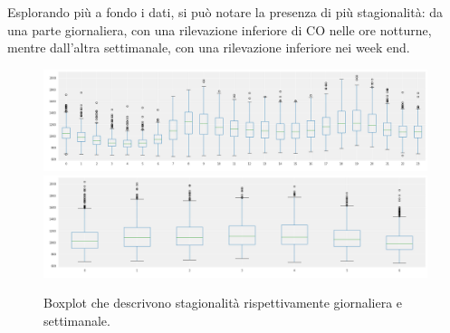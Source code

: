 Esplorando più a fondo i dati, si può notare la presenza di più stagionalità: da una parte giornaliera, con una rilevazione inferiore di CO nelle ore notturne, mentre dall'altra settimanale, con una rilevazione inferiore nei week end. 

\begin{figure}[H]
\centering
\includegraphics[width=14cm]{Pictures/co_oraria.png}
\includegraphics[width=14cm]{Pictures/co_settimanale.png}
\caption{Boxplot che descrivono stagionalità rispettivamente giornaliera e settimanale.}
\end{figure}